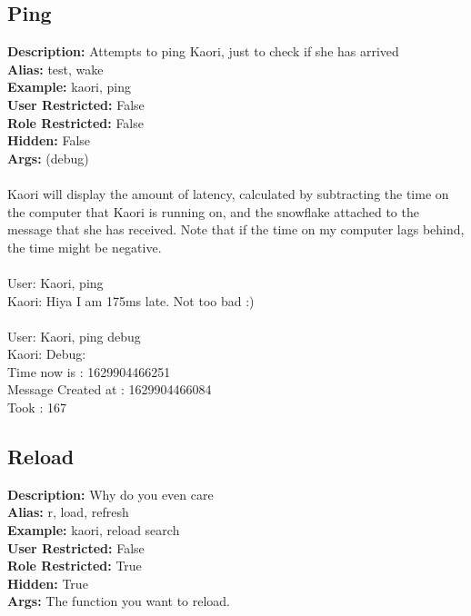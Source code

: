 \documentclass[11pt]{article}
\begin{document}
\subsection{Ping}
\textbf{Description: } \hspace{5pt} Attempts to ping Kaori, just to check if she has arrived\\
\textbf{Alias: } \hspace{5pt} test, wake \\
\textbf{Example: } \hspace{5pt} kaori, ping\\
\textbf{User Restricted: } \hspace{5pt} False\\
\textbf{Role Restricted: } \hspace{5pt} False\\
\textbf{Hidden: } \hspace{5pt} False\\
\textbf{Args: } \hspace{5pt} (debug)
\\ \\
Kaori will display the amount of latency, calculated by subtracting the time on the computer that Kaori is running on, and the snowflake attached to the message that she has received. Note that if the time on my computer lags behind, the time might be negative. \\ \\
User: Kaori, ping
\\
Kaori: Hiya I am 175ms late. Not too bad :)
\\ \\
User: Kaori, ping debug
\\ 
Kaori: Debug: 
\\
Time now is : 1629904466251
\\
Message Created at : 1629904466084 
\\
Took : 167

\subsection{Reload}
\textbf{Description: } \hspace{5pt} Why do you even care \\
\textbf{Alias: } \hspace{5pt} r, load, refresh \\
\textbf{Example: } \hspace{5pt} kaori, reload search \\
\textbf{User Restricted: } \hspace{5pt} False\\
\textbf{Role Restricted: } \hspace{5pt} True\\
\textbf{Hidden: } \hspace{5pt} True\\
\textbf{Args: } \hspace{5pt} The function you want to reload.
\end{document}

